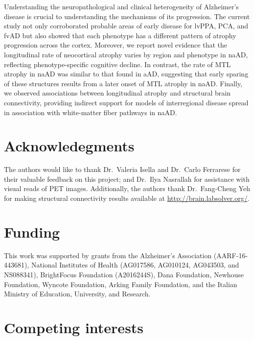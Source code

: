 \documentclass[]{article}
\begin{document}
Understanding the neuropathological and clinical heterogeneity of
Alzheimer's disease is crucial to understanding the mechanisms of its
progression. The current study not only corroborated probable areas of
early disease for lvPPA, PCA, and fvAD but also showed that each
phenotype has a different pattern of atrophy progression across the
cortex. Moreover, we report novel evidence that the longitudinal rate of
neocortical atrophy varies by region and phenotype in naAD, reflecting
phenotype-specific cognitive decline. In contrast, the rate of MTL
atrophy in naAD was similar to that found in aAD, suggesting that early
sparing of these structures results from a later onset of MTL atrophy in
naAD. Finally, we observed associations between longitudinal atrophy and
structural brain connectivity, providing indirect support for models of
interregional disease spread in association with white-matter fiber
pathways in naAD.

\section*{Acknowledegments}\label{acknowledegments}

The authors would like to thank Dr.~Valeria Isella and Dr.~Carlo
Ferrarese for their valuable feedback on this project; and Dr.~Ilya
Nasrallah for assistance with visual reads of PET images. Additionally,
the authors thank Dr.~Fang-Cheng Yeh for making structural connectivity
results available at \url{http://brain.labsolver.org/}.

\section*{Funding}\label{funding}

This work was supported by grants from the Alzheimer's Association
(AARF-16-443681), National Institutes of Health (AG017586, AG010124,
AG043503, and NS088341), BrightFocus Foundation (A2016244S), Dana
Foundation, Newhouse Foundation, Wyncote Foundation, Arking Family
Foundation, and the Italian Ministry of Education, University, and
Research.

\section*{Competing interests}\label{competing-interests}
\end{document}

